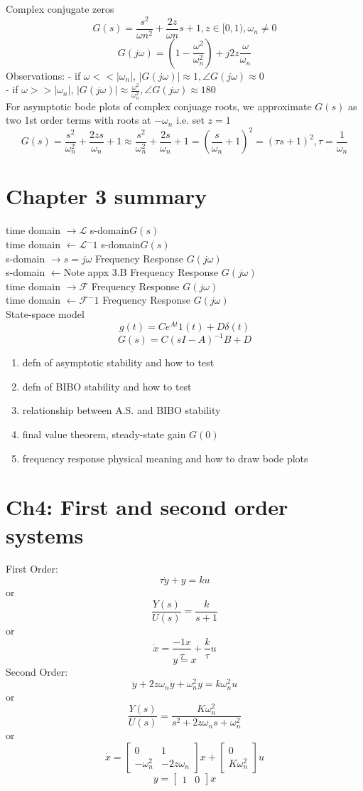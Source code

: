 \documentclass[letterpaper]{article}
\begin{document}
Complex conjugate zeros
$$G(s)=\frac{s^2}{\omega n^2}+\frac{2z}{\omega n}s + 1, z\in [0,1),\omega_n \not = 0$$
$$G(j\omega)=(1-\frac{\omega^2}{\omega_n^2})+j2z\frac{\omega}{\omega_n}$$
Observations:
- if $\omega << |\omega_n|$, $|G(j\omega)| \approx 1, \angle G(j\omega)\approx 0$\\
- if $\omega >> |\omega_n|$, $|G(j\omega)|\approx \frac{\omega^2}{\omega_n^2},\angle G(j\omega) \approx 180$\\
For asymptotic bode plots of complex conjuage roots, we approximate $G(s)$
as two 1st order terms with roots at $-\omega_n$ i.e. set $z=1$
$$G(s)=\frac{s^2}{\omega_n^2}+\frac{2zs}{\omega_n}+1\approx \frac{s^2}{\omega_n^2}+\frac{2s}{\omega_n}+1=(\frac{s}{\omega_n}+1)^2=(\tau s+1)^2, \tau=\frac{1}{\omega_n}$$
\section*{Chapter 3 summary}
time domain $\rightarrow \mathscr{L}$ s-domain$G(s)$\\
time domain $\leftarrow \mathscr{L}^-1$ s-domain$G(s)$\\
s-domain $\rightarrow s=j\omega$ Frequency Response $G(j\omega)$\\
s-domain $\leftarrow $Note appx 3.B Frequency Response $G(j\omega)$\\
time domain $\rightarrow \mathscr{F}$  Frequency Response $G(j\omega)$\\
time domain $\leftarrow \mathscr{F}^-1$  Frequency Response $G(j\omega)$\\
State-space model
$$g(t)=Ce^{At}1(t)+D\delta(t)$$
$$G(s)=C(sI-A)^{-1}B+D$$
\begin{enumerate}
	\item defn of asymptotic stability and how to test
	\item defn of BIBO stability and how to test
	\item relationship between A.S. and BIBO stability
	\item final value theorem, steady-state gain $G(0)$
	\item frequency response physical meaning and how to draw bode plots
\end{enumerate}
	
\section*{Ch4: First and second order systems}
First Order:
$$\tau \dot y+y=ku$$
or $$\frac{Y(s)}{U(s)}=\frac{k}{s+1}$$
or $$\dot x=\frac{-1x}{\tau}+\frac{k}{\tau}u$$
$$y=x$$
Second Order:
$$\ddot y+2z\omega_n\dot y+\omega_n^2y=k\omega_n^2u$$
or $$\frac{Y(s)}{U(s)}=\frac{K\omega_n^2}{s^2+2z\omega_ns+\omega_n^2}$$
or $$\dot x = \begin{bmatrix} 0&1\\-\omega_n^2&-2z\omega_n\end{bmatrix}x+\begin{bmatrix} 0\\K\omega_n^2\end{bmatrix}u$$
$$y=\begin{bmatrix}1&0\end{bmatrix}x$$
\end{document}
